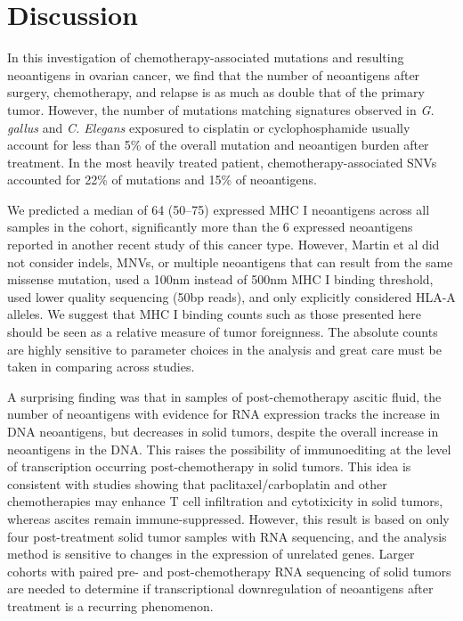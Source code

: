 \section*{Discussion}

In this investigation of chemotherapy-associated mutations and resulting neoantigens in ovarian cancer, we find that the number of neoantigens after surgery, chemotherapy, and relapse is as much as double that of the primary tumor. However, the number of mutations matching signatures observed in \textit{G. gallus} and \textit{C. Elegans} exposured to cisplatin or cyclophosphamide usually account for less than 5\% of the overall mutation and neoantigen burden after treatment. In the most heavily treated patient, chemotherapy-associated SNVs accounted for 22\% of mutations and 15\% of neoantigens.

We predicted a median of 64 (50--75) expressed MHC I neoantigens across all samples in the cohort, significantly more than the 6 expressed neoantigens reported in another recent study of this cancer type\cite{Martin_2016}. However, Martin et al did not consider indels, MNVs, or multiple neoantigens that can result from the same missense mutation, used a 100nm instead of 500nm MHC I binding threshold, used lower quality sequencing (50bp reads), and only explicitly considered HLA-A alleles. We suggest that MHC I binding counts such as those presented here should be seen as a relative measure of tumor foreignness. The absolute counts are highly sensitive to parameter choices in the analysis and great care must be taken in comparing across studies.

A surprising finding was that in samples of post-chemotherapy ascitic fluid, the number of neoantigens with evidence for RNA expression tracks the increase in DNA neoantigens, but decreases in solid tumors, despite the overall increase in neoantigens in the DNA. This raises the possibility of immunoediting\cite{Dunn_2002} at the level of transcription occurring post-chemotherapy in solid tumors. This idea is consistent with studies showing that paclitaxel/carboplatin and other chemotherapies may enhance T cell infiltration and cytotixicity in solid tumors\cite{Demaria2001,Wu_2009,Pfannenstiel_2010,Hodge_2013}, whereas ascites remain immune-suppressed\cite{Giuntoli2009,Simpson-Abelson2013,Singel2016}. However, this result is based on only four post-treatment solid tumor samples with RNA sequencing, and the analysis method is sensitive to changes in the expression of unrelated genes. Larger cohorts with paired pre- and post-chemotherapy RNA sequencing of solid tumors are needed to determine if transcriptional downregulation of neoantigens after treatment is a recurring phenomenon.

